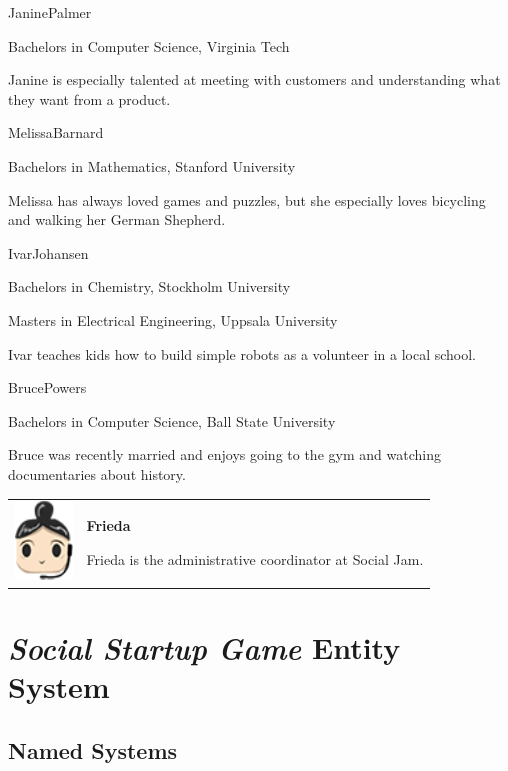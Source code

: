 \documentclass[letterpaper]{article}
\begin{document}
\begin{character}{Janine}{Palmer}
{\item Bachelors in Computer Science, Virginia Tech}
Janine is especially talented at meeting with customers and understanding what they want from a product.
\end{character}

\begin{character}{Melissa}{Barnard}
{\item Bachelors in Mathematics, Stanford University}
Melissa has always loved games and puzzles, but she especially loves bicycling and walking her German Shepherd.
\end{character}

\begin{character}{Ivar}{Johansen}
{\item Bachelors in Chemistry, Stockholm University
 \item Masters in Electrical Engineering, Uppsala University}
Ivar teaches kids how to build simple robots as a volunteer in a local school.
\end{character}

\begin{character}{Bruce}{Powers}
{\item Bachelors in Computer Science, Ball State University}
Bruce was recently married and enjoys going to the gym and watching documentaries about history.
\end{character}

\begin{tabular}{p{1.25in}p{4in}}
\includegraphics[width=0.6in]{images/Frieda.png}
&
\textbf{Frieda}

Frieda is the administrative coordinator at Social Jam.
\end{tabular}

\clearpage
\section{\textit{Social Startup Game} Entity System}
\label{appendix:entity-system}

\subsection*{Named Systems}
\end{document}

